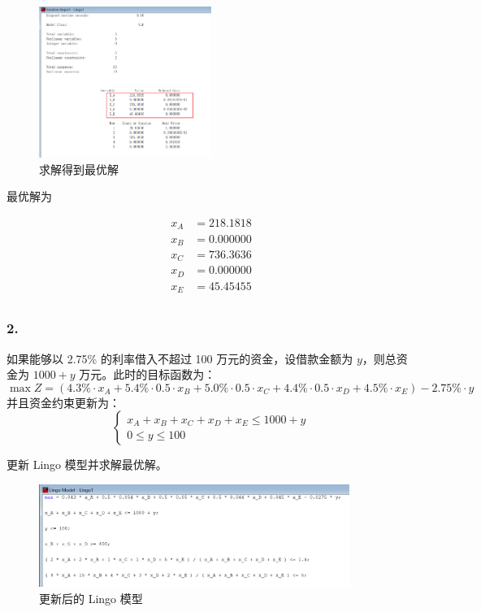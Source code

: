 \documentclass{article}
\begin{document}
\begin{figure}[H]
\centering
\includegraphics[width=0.5\textwidth]{img/2.png}
\caption{求解得到最优解}
\end{figure}

最优解为

$$
\begin{aligned}
    x_A & = 218.1818 \\
    x_B & = 0.000000 \\
    x_C & = 736.3636 \\
    x_D & = 0.000000 \\
    x_E & = 45.45455 \\
\end{aligned}
$$

\subsubsection*{2.}

如果能够以 2.75\% 的利率借入不超过 100 万元的资金，设借款金额为 \(y\)，则总资金为 \(1000 + y\) 万元。此时的目标函数为：
\[
\max Z = (4.3\% \cdot x_A + 5.4\% \cdot 0.5 \cdot x_B + 5.0\% \cdot 0.5 \cdot x_C + 4.4\% \cdot 0.5 \cdot x_D + 4.5\% \cdot x_E) - 2.75\% \cdot y
\]
并且资金约束更新为：
\[
\begin{cases}
    x_A + x_B + x_C + x_D + x_E \leq 1000 + y \\
    0 \leq y \leq 100
\end{cases}
\]

更新 Lingo 模型并求解最优解。

\begin{figure}[H]
\centering
\includegraphics[width=0.9\textwidth]{img/3.png}
\caption{更新后的 Lingo 模型}
\end{figure}
\end{document}
